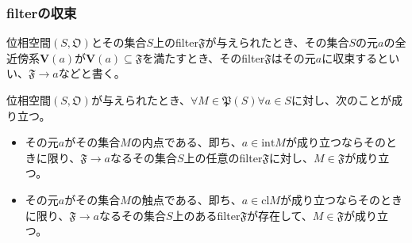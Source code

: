 \documentclass[dvipdfmx]{jsarticle}
\begin{document}
\subsubsection{filterの収束}%
\begin{dfn}\label{filterの収束}
位相空間$\left( S,\mathfrak{O} \right)$とその集合$S$上のfilter$\mathfrak{F}$が与えられたとき、その集合$S$の元$a$の全近傍系$\mathbf{V}(a)$が$\mathbf{V}(a)\subseteq \mathfrak{F}$を満たすとき、そのfilter$\mathfrak{F}$はその元$a$に収束するといい、$\mathfrak{F} \rightarrow a$などと書く。
\end{dfn}
\begin{thm}\label{8.1.8.3}
位相空間$\left( S,\mathfrak{O} \right)$が与えられたとき、$\forall M \in \mathfrak{P}(S)\forall a \in S$に対し、次のことが成り立つ。
\begin{itemize}
\item
  その元$a$がその集合$M$の内点である、即ち、$a \in {\mathrm{int}}M$が成り立つならそのときに限り、$\mathfrak{F} \rightarrow a$なるその集合$S$上の任意のfilter$\mathfrak{F}$に対し、$M \in \mathfrak{F}$が成り立つ。
\item
  その元$a$がその集合$M$の触点である、即ち、$a \in {\mathrm{cl}}M$が成り立つならそのときに限り、$\mathfrak{F} \rightarrow a$なるその集合$S$上のあるfilter$\mathfrak{F}$が存在して、$M \in \mathfrak{F}$が成り立つ。
\end{itemize}
\end{thm}
\end{document}
